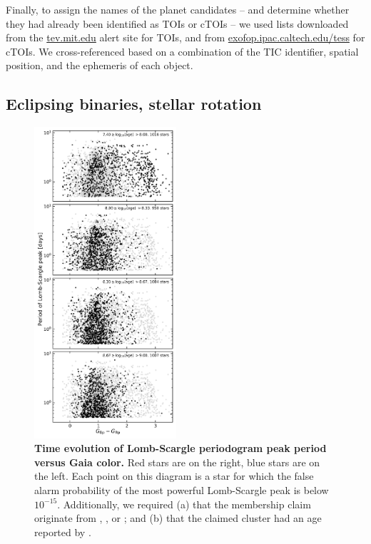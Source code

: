 \documentclass[12pt,twocolumn,tighten]{aastex62}
\begin{document}
Finally, to assign the names of the planet candidates -- and determine
whether they had already been identified as TOIs or cTOIs -- we used
lists downloaded from the \url{tev.mit.edu} alert site for TOIs, and
from \url{exofop.ipac.caltech.edu/tess} for cTOIs.  We
cross-referenced based on a combination of the TIC identifier, spatial
position, and the ephemeris of each object.


\subsection{Eclipsing binaries, stellar rotation}

\begin{figure}[t]
	\begin{center}
		\leavevmode
		\includegraphics[width=0.47\textwidth]{LS_period_vs_color_and_age.png}
	\end{center}
	\vspace{-0.2cm}
	\caption{
    {\bf Time evolution of Lomb-Scargle periodogram peak period versus
    Gaia color.}
    Red stars are on the right, blue stars are on the left.
    Each point on this diagram is a star for which the false alarm
    probability of the most powerful Lomb-Scargle peak is below
    $10^{-15}$.
    Additionally, we required (a) that the membership claim originate
    from \citet{cantat-gaudin_gaia_2018},
    \citet{Kharchenko_et_al_2013}, or \citet{gaia_hr_2018}; and (b)
    that the claimed cluster had an age reported by
    \citet{Kharchenko_et_al_2013}.
	\label{fig:ls_peak_vs_time}
	}
\end{figure}
\end{document}
